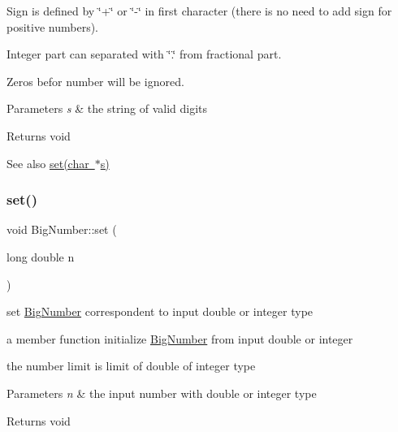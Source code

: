 \begin{DoxyItemize}
\item Sign is defined by \char`\"{}+\char`\"{} or \char`\"{}-\/\char`\"{} in first character (there is no need to add sign for positive numbers).
\item Integer part can separated with \char`\"{}.\char`\"{} from fractional part.
\item Zeros befor number will be ignored.
\end{DoxyItemize}


\begin{DoxyParams}{Parameters}
{\em s} & the string of valid digits \\
\hline
\end{DoxyParams}
\begin{DoxyReturn}{Returns}
void
\end{DoxyReturn}
\begin{DoxySeeAlso}{See also}
\mbox{\hyperlink{class_big_number_af744b8e9da0e5d99a9e99d2e97ed95a6}{set(char $\ast$s)}} 
\end{DoxySeeAlso}
\mbox{\label{class_big_number_aa9cb87a230df925f241756d1e98f1057}} 
\subsubsection{\texorpdfstring{set()}{set()}\hspace{0.1cm}{\footnotesize\ttfamily [2/3]}}
{\footnotesize\ttfamily void Big\+Number\+::set (\begin{DoxyParamCaption}\item[{long double}]{n }\end{DoxyParamCaption})}



set \mbox{\hyperlink{class_big_number}{Big\+Number}} correspondent to input double or integer type 

a member function initialize \mbox{\hyperlink{class_big_number}{Big\+Number}} from input double or integer

the number limit is limit of double of integer type


\begin{DoxyParams}{Parameters}
{\em n} & the input number with double or integer type \\
\hline
\end{DoxyParams}
\begin{DoxyReturn}{Returns}
void 
\end{DoxyReturn}
\mbox{\label{class_big_number_af744b8e9da0e5d99a9e99d2e97ed95a6}} 
